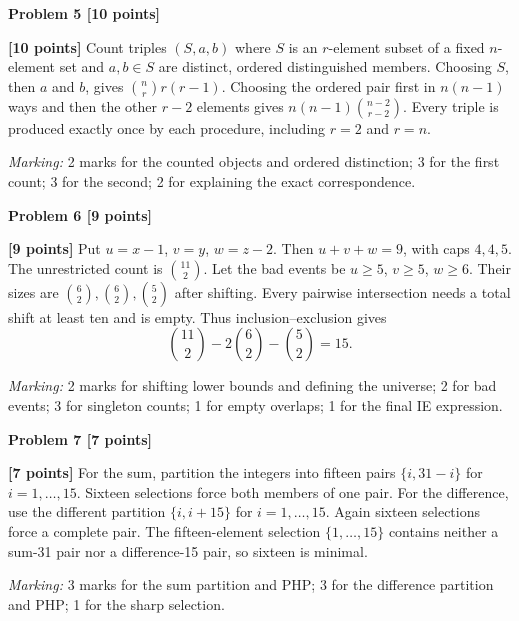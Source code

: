 \documentclass[12pt,letterpaper]{article}
\newcommand{\problemheading}[2][5\baselineskip]{\Needspace{#1}\par\noindent\hspace*{-0.625in}\textbf{#2}\par\nobreak\vspace{0.3em}}
\begin{document}
\vspace{0.65em}
\problemheading[\dimexpr 3\baselineskip+4\baselineskip\relax]{Problem 5 [10 points]}
\begin{description}[font=\normalfont,leftmargin=1.2em,labelsep=0.4em]
\item[] \textbf{[10 points]} Count triples $(S,a,b)$ where $S$ is an $r$-element subset of a fixed $n$-element set and $a,b\in S$ are distinct, ordered distinguished members. Choosing $S$, then $a$ and $b$, gives $\binom nr r(r-1)$. Choosing the ordered pair first in $n(n-1)$ ways and then the other $r-2$ elements gives $n(n-1)\binom{n-2}{r-2}$. Every triple is produced exactly once by each procedure, including $r=2$ and $r=n$.
\par\textit{Marking:} 2 marks for the counted objects and ordered distinction; 3 for the first count; 3 for the second; 2 for explaining the exact correspondence.
\end{description}
\vspace{0.65em}
\problemheading[\dimexpr 3\baselineskip+4\baselineskip\relax]{Problem 6 [9 points]}
\begin{description}[font=\normalfont,leftmargin=1.2em,labelsep=0.4em]
\item[] \textbf{[9 points]} Put $u=x-1$, $v=y$, $w=z-2$. Then $u+v+w=9$, with caps $4,4,5$. The unrestricted count is $\binom{11}{2}$. Let the bad events be $u\ge5$, $v\ge5$, $w\ge6$. Their sizes are $\binom62,\binom62,\binom52$ after shifting. Every pairwise intersection needs a total shift at least ten and is empty. Thus inclusion--exclusion gives\[\binom{11}{2}-2\binom62-\binom52=15.\]
\par\textit{Marking:} 2 marks for shifting lower bounds and defining the universe; 2 for bad events; 3 for singleton counts; 1 for empty overlaps; 1 for the final IE expression.
\end{description}
\vspace{0.65em}
\problemheading[\dimexpr 3\baselineskip+4\baselineskip\relax]{Problem 7 [7 points]}
\begin{description}[font=\normalfont,leftmargin=1.2em,labelsep=0.4em]
\item[] \textbf{[7 points]} For the sum, partition the integers into fifteen pairs $\{i,31-i\}$ for $i=1,\ldots,15$. Sixteen selections force both members of one pair. For the difference, use the different partition $\{i,i+15\}$ for $i=1,\ldots,15$. Again sixteen selections force a complete pair. The fifteen-element selection $\{1,\ldots,15\}$ contains neither a sum-31 pair nor a difference-15 pair, so sixteen is minimal.
\par\textit{Marking:} 3 marks for the sum partition and PHP; 3 for the difference partition and PHP; 1 for the sharp selection.
\end{description}
\end{document}
